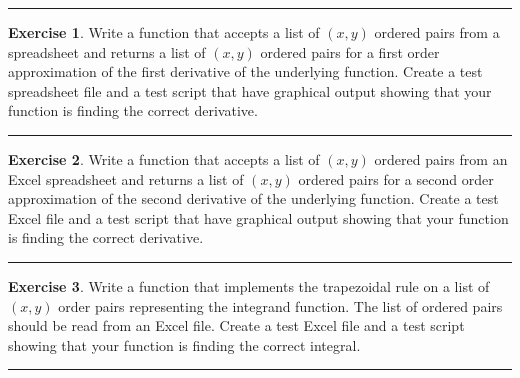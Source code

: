 \documentclass[
]{book}
\theoremstyle{definition}
\theoremstyle{definition}
\theoremstyle{definition}
\newtheorem{exercise}{Exercise}[chapter]
\theoremstyle{remark}
\begin{document}
\begin{center}\rule{0.5\linewidth}{0.5pt}\end{center}

\begin{exercise}
\protect\hypertarget{exr:unnamed-chunk-260}{}{\label{exr:unnamed-chunk-260} }Write a function that accepts a list of
\((x,y)\) ordered pairs from a spreadsheet and returns a list of
\((x,y)\) ordered pairs for a first order approximation of the first
derivative of the underlying function. Create a test spreadsheet file and a
test script that have graphical output showing that your function is
finding the correct derivative.
\end{exercise}

\begin{center}\rule{0.5\linewidth}{0.5pt}\end{center}

\begin{exercise}
\protect\hypertarget{exr:unnamed-chunk-261}{}{\label{exr:unnamed-chunk-261} }Write a function that accepts a list of \((x,y)\) ordered pairs from an
Excel spreadsheet and returns a list of \((x,y)\) ordered pairs for a
second order approximation of the second derivative of the underlying
function. Create a test Excel file and a test script that have graphical
output showing that your function is finding the correct derivative.
\end{exercise}

\begin{center}\rule{0.5\linewidth}{0.5pt}\end{center}

\begin{exercise}
\protect\hypertarget{exr:unnamed-chunk-262}{}{\label{exr:unnamed-chunk-262} }Write a function that implements the
trapezoidal rule on a list of \((x,y)\) order pairs representing the
integrand function. The list of ordered pairs should be read from an
Excel file. Create a test Excel file and a test script showing that your
function is finding the correct integral.
\end{exercise}

\begin{center}\rule{0.5\linewidth}{0.5pt}\end{center}
\end{document}
